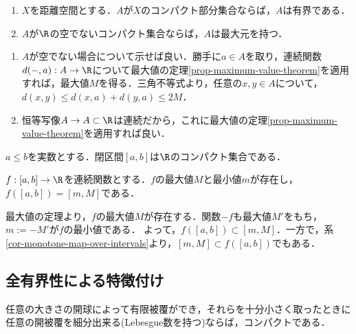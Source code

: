 \documentclass[uplatex,dvipdfmx]{jsreport}
\begin{document}
\begin{corollary}[距離空間のコンパクト集合]\label{cor-compact-sets-in-metric-space-is-bounded}\mbox{}
    \begin{enumerate}
        \item $X$を距離空間とする．$A$が$X$のコンパクト部分集合ならば，$A$は有界である．
        \item $A$が$\R$の空でないコンパクト集合ならば，$A$は最大元を持つ．
    \end{enumerate}
\end{corollary}
\begin{Proof}\mbox{}
    \begin{enumerate}
        \item $A$が空でない場合について示せば良い．勝手に$a\in A$を取り，連続関数$d(-,a):A\to\R$について最大値の定理\ref{prop-maximum-value-theorem}を適用すれば，最大値$M$を得る．三角不等式より，任意の$x,y\in A$について，$d(x,y)\le d(x,a)+d(y,a)\le 2M$．
        \item 恒等写像$A\to A\subset\R$は連続だから，これに最大値の定理\ref{prop-maximum-value-theorem}を適用すれば良い．
    \end{enumerate}
\end{Proof}
\begin{theorem}\label{thm-Heine-Borel}
    $a\le b$を実数とする．閉区間$[a,b]$は$\R$のコンパクト集合である．
\end{theorem}

\begin{corollary}
    $f:[a,b]\to\R$を連続関数とする．$f$の最大値$M$と最小値$m$が存在し，$f([a,b])=[m,M]$である．
\end{corollary}
\begin{Proof}
    最大値の定理より，$f$の最大値$M$が存在する．関数$-f$も最大値$M'$をもち，$m:=-M'$が$f$の最小値である．
    よって，$f([a,b])\subset[m,M]$．一方で，系\ref{cor-monotone-map-over-intervals}より，$[m,M]\subset f([a,b])$でもある．
\end{Proof}

\subsection{全有界性による特徴付け}

\begin{tcolorbox}[colframe=ForestGreen, colback=ForestGreen!10!white,breakable,colbacktitle=ForestGreen!40!white,coltitle=black,fonttitle=\bfseries\sffamily,
title=Lebesgueの補題]
    任意の大きさの開球によって有限被覆ができ，それらを十分小さく取ったときに任意の開被覆を細分出来る(Lebesgue数を持つ)ならば，コンパクトである．
\end{tcolorbox}
\end{document}
